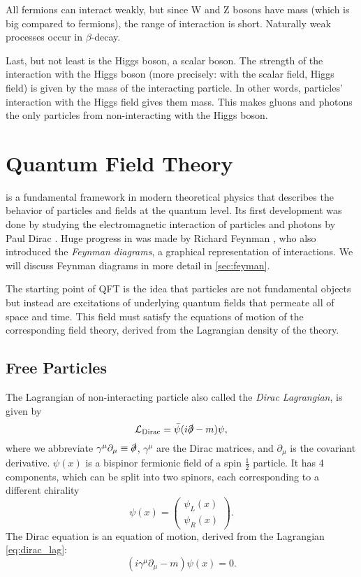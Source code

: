 All fermions can interact weakly, but since W and Z bosons have mass (which is big compared to fermions), the range of interaction is short.
Naturally weak processes occur in $\beta$-decay.

Last, but not least is the Higgs boson, a scalar boson.
The strength of the interaction with the Higgs boson (more precisely: with the scalar field, Higgs field) is given by the mass of the interacting particle.
In other words, particles' interaction with the Higgs field gives them mass.
This makes gluons and photons the only particles from \SM non-interacting with the Higgs boson.



\section{Quantum Field Theory}
\label{sec:qft}
\QFT is a fundamental framework in modern theoretical physics that describes the behavior of particles and fields at the quantum level.
Its first development was done by studying the electromagnetic interaction of particles and photons by Paul Dirac \cite{dirac}.
Huge progress in \QED was made by Richard Feynman \cite{feynman}, who also introduced the \emph{Feynman diagrams}, a graphical representation of interactions.
We will discuss Feynman diagrams in more detail in \cref{sec:feyman}.

The starting point of QFT is the idea that particles are not fundamental objects but instead are excitations of underlying quantum fields that permeate all of space and time. 
This field must satisfy the equations of motion of the corresponding field theory, derived from the Lagrangian density of the theory.

\subsection{Free Particles}
\label{sec:free_particles}
The Lagrangian of non-interacting \spinhalf particle also called the \emph{Dirac Lagrangian}, is given by
\begin{equation}
    \label{eq:dirac_lag}
    \mathcal{L}_{\text{Dirac}} = \bar{\psi}(i\slashed{\partial} - m) \psi,
\end{equation}
where we abbreviate $\gamma^\mu \partial_\mu \equiv \slashed{\partial}$, $\gamma^\mu$ are the Dirac matrices, and $\partial_\mu$ is the covariant derivative.
$\psi(x)$ is a bispinor fermionic field of a spin $\frac{1}{2}$ particle. 
It has 4 components, which can be split into two spinors, each corresponding to a different chirality
\begin{equation}
    \psi(x) = \left( \begin{array}{c} \psi_L(x) \\ \psi_R(x) \end{array} \right).
\end{equation}
The Dirac equation is an equation of motion, derived from the Lagrangian \cref{eq:dirac_lag}:
\begin{equation}
    \label{eq:dirac_eq}
    \left( i \gamma^\mu \partial_\mu - m \right) \psi(x) = 0.
\end{equation}

